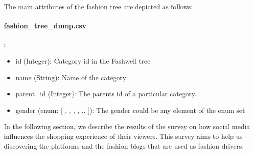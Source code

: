 The main attributes of the fashion tree are depicted as follows:

\paragraph*{fashion\_tree\_dump.csv}:

\begin{itemize}
    \item id (Integer): Category id in the Fashwell tree
    \item name (String): Name of the category
    \item parent\_id (Integer): The parents id of a particular category. 
    \item gender (enum: [ , ,  , , ,,  ]): The gender could be any element of the enum set
\end{itemize}

In the following section, we describe the results of the survey on how social media influences the shopping experience of their viewers. This survey aims to help us discovering the platforms and the fashion blogs that are used as fashion drivers. 

